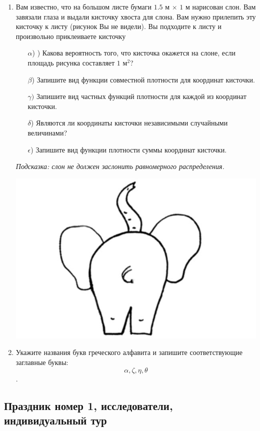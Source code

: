 \documentclass[12pt, a4paper]{article}\usepackage[]{graphicx}\usepackage[]{color}
\begin{document}
\begin{enumerate}
\item
Вам известно, что на большом листе бумаги $1.5$ м $\times$ $1$ м нарисован слон. Вам завязали
глаза и выдали кисточку хвоста для слона. Вам нужно прилепить эту кисточку к
листу (рисунок Вы не видели). Вы подходите к листу и произвольно приклеиваете
кисточку
\begin{enumerate}
    \item[$\alpha$)] ) Какова вероятность того, что кисточка окажется на слоне, если площадь рисунка составляет $1$ м$^2$?
    \item[$\beta$)]  Запишите вид функции совместной плотности для координат кисточки.
    \item[$\gamma)$] Запишите вид частных функций плотности для каждой из координат кисточки.
    \item[$\delta$)] Являются ли координаты кисточки независимыми случайными величинами?
    \item[$\epsilon$)] Запишите вид функции плотности суммы координат кисточки.
\end{enumerate}
\textit{Подсказка: слон не должен заслонить равномерного распределения.}

\begin{center}
\includegraphics[scale=1.5]{images/slon.jpg}
\end{center}

\item
Укажите названия букв греческого алфавита и запишите соответствующие заглавные буквы:
\[\alpha, \zeta, \eta, \theta\].

\end{enumerate}



\subsection{Праздник номер 1, исследователи, индивидуальный тур}
\end{document}
